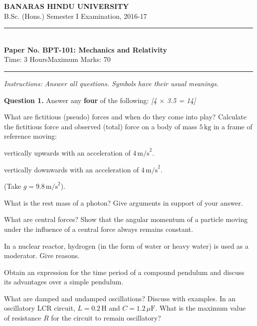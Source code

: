 \documentclass[11pt,a4paper]{article}
\newcommand{\pts}[1]{\hfill   \textit{[#1]}}
\begin{document}
\begin{center}
  {\large\bfseries BANARAS HINDU UNIVERSITY}\\[2pt]
  {\normalsize B.Sc. (Hons.) Semester I Examination, 2016-17}\\[6pt]
  \rule{0.8\linewidth}{0.5pt}\\[6pt]
  {\large\bfseries Paper No. BPT-101: Mechanics and Relativity}\\[4pt]
  {\normalsize Time: 3 Hours\hfill Maximum Marks: 70}
\end{center}
\rule{\linewidth}{0.4pt}
\smallskip



\noindent   \textit{Instructions: Answer all questions. Symbols have their usual meanings.}
\bigskip




\noindent   \textbf{Question 1.} Answer any   \textbf{four} of the following: \pts{4 $ \times$ 3.5 = 14}

\begin{parts}
  \item What are fictitious (pseudo) forces and when do they come into play? Calculate the fictitious force and observed (total) force on a body of mass $5\, \text{kg}$ in a frame of reference moving:
    
\begin{parts}
      \item vertically upwards with an acceleration of $4\, \text{m/s}^2$.
      \item vertically downwards with an acceleration of $4\, \text{m/s}^2$.
    \end{parts}
    (Take $g = 9.8\, \text{m/s}^2$).
  \item What is the rest mass of a photon? Give arguments in support of your answer.
  \item What are central forces? Show that the angular momentum of a particle moving under the influence of a central force always remains constant.
  \item In a nuclear reactor, hydrogen (in the form of water or heavy water) is used as a moderator. Give reasons.
  \item Obtain an expression for the time period of a compound pendulum and discuss its advantages over a simple pendulum.
  \item What are damped and undamped oscillations? Discuss with examples. In an oscillatory LCR circuit, $L = 0.2\, \text{H}$ and $C = 1.2\,\mu \text{F}$. What is the maximum value of resistance $R$ for the circuit to remain oscillatory?
\end{parts}
\end{document}
